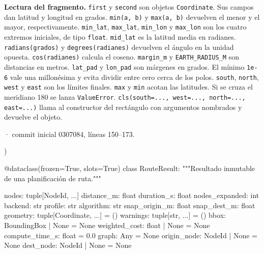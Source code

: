 \documentclass[11pt,a4paper]{article}
\begin{document}
\textbf{Lectura del fragmento.} \texttt{first} y \texttt{second} son objetos \texttt{Coordinate}. Sus campos dan latitud y longitud en grados. \texttt{min(a, b)} y \texttt{max(a, b)} devuelven el menor y el mayor, respectivamente. \texttt{min\_lat}, \texttt{max\_lat}, \texttt{min\_lon} y \texttt{max\_lon} son los cuatro extremos iniciales, de tipo \texttt{float}. \texttt{mid\_lat} es la latitud media en radianes. \texttt{radians(grados)} y \texttt{degrees(radianes)} devuelven el ángulo en la unidad opuesta. \texttt{cos(radianes)} calcula el coseno. \texttt{margin\_m} y \texttt{EARTH\_RADIUS\_M} son distancias en metros. \texttt{lat\_pad} y \texttt{lon\_pad} son márgenes en grados. El mínimo \texttt{1e-6} vale una millonésima y evita dividir entre cero cerca de los polos. \texttt{south}, \texttt{north}, \texttt{west} y \texttt{east} son los límites finales. \texttt{max} y \texttt{min} acotan las latitudes. Si se cruza el meridiano 180 se lanza \texttt{ValueError}. \texttt{cls(south=..., west=..., north=..., east=...)} llama al constructor del rectángulo con argumentos nombrados y devuelve el objeto.


\smallskip
{\footnotesize\texttt{} · commit inicial 0307084, líneas 150--173.}\par
\begin{Codigo}[firstnumber=150]
        )


@dataclass(frozen=True, slots=True)
class RouteResult:
    """Resultado inmutable de una planificación de ruta."""

    nodes: tuple[NodeId, ...]
    distance_m: float
    duration_s: float
    nodes_expanded: int
    backend: str
    profile: str
    algorithm: str
    snap_origin_m: float
    snap_dest_m: float
    geometry: tuple[Coordinate, ...] = ()
    warnings: tuple[str, ...] = ()
    bbox: BoundingBox | None = None
    weighted_cost: float | None = None
    compute_time_s: float = 0.0
    graph: Any = None
    origin_node: NodeId | None = None
    dest_node: NodeId | None = None
\end{Codigo}
\end{document}
